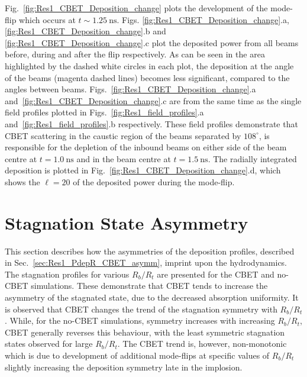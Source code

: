 Fig.~\ref{fig:Res1_CBET_Deposition_change} plots the development of the mode-flip which occurs at $t\sim 1.25\ \text{ns}$.
Figs. \ref{fig:Res1_CBET_Deposition_change}.a, \ref{fig:Res1_CBET_Deposition_change}.b and \ref{fig:Res1_CBET_Deposition_change}.c plot the deposited power from all beams before, during and after the flip respectively.
As can be seen in the area highlighted by the dashed white circles in each plot, the deposition at the angle of the beams (magenta dashed lines) becomes less significant, compared to the angles between beams.
Figs.~\ref{fig:Res1_CBET_Deposition_change}.a and~\ref{fig:Res1_CBET_Deposition_change}.c are from the same time as the single field profiles plotted in Figs.~\ref{fig:Res1_field_profiles}.a and~\ref{fig:Res1_field_profiles}.b respectively.
These field profiles demonstrate that \ac{CBET} scattering in the caustic region of the beams separated by $108^{\circ}$, is responsible for the depletion of the inbound beams on either side of the beam centre at $t=1.0\ \text{ns}$ and in the beam centre at $t=1.5\ \text{ns}$.
The radially integrated deposition is plotted in Fig.~\ref{fig:Res1_CBET_Deposition_change}.d, which shows the $\ell=20$ of the deposited power during the mode-flip.

\section{Stagnation State Asymmetry}%
\label{sec:Res1_StagnationAsymm}

This section describes how the asymmetries of the deposition profiles, described in Sec.~\ref{sec:Res1_PdepR_CBET_asymm}, imprint upon the hydrodynamics.
The stagnation profiles for various $R_b/R_t$ are presented for the \ac{CBET} and no-\ac{CBET} simulations.
These demonstrate that \ac{CBET} tends to increase the asymmetry of the stagnated state, due to the decreased absorption uniformity.
It is observed that \ac{CBET} changes the trend of the stagnation symmetry with $R_b/R_t$.
While, for the no-\ac{CBET} simulations, symmetry increases with increasing $R_b/R_t$, \ac{CBET} generally reverses this behaviour, with the least symmetric stagnation states observed for large $R_b/R_t$.
The \ac{CBET} trend is, however, non-monotonic which is due to development of additional mode-flips at specific values of $R_b/R_t$ slightly increasing the deposition symmetry late in the implosion.


